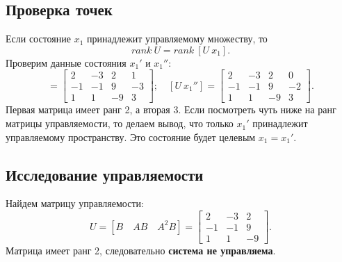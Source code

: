 \subsection{Проверка точек}

Если состояние $x_1$ принадлежит управляемому множеству, то
\begin{equation*}
    rank\ U=rank\ [U\ x_1].
\end{equation*}
Проверим данные состояния $x_1'$ и $x_1''$:
\begin{equation*}
    [U\ x_1']=
    \begin{bmatrix}
        2 & -3 & 2 & 1\\
        -1 & -1 & 9 & -3\\
        1 & 1 & -9 & 3
    \end{bmatrix};\quad
    [U\ x_1'']=
    \begin{bmatrix}
        2 & -3 & 2 & 0\\
        -1 & -1 & 9 & -2\\
        1 & 1 & -9 & 3
    \end{bmatrix}.
\end{equation*}
Первая матрица имеет ранг 2, а вторая 3. Если посмотреть чуть ниже на ранг матрицы управляемости,
то делаем вывод, что только $x_1'$ принадлежит управляемому пространству. Это состояние будет
целевым $x_1=x_1'$.

\subsection{Исследование управляемости}

Найдем матрицу управляемости:
\begin{equation*}
    U=[B\quad AB\quad A^2B]=
    \begin{bmatrix}
        2 & -3 & 2 \\ -1 & -1 & 9 \\ 1 & 1 & -9
    \end{bmatrix}.
\end{equation*}
Матрица имеет ранг 2, следовательно \textbf{система не управляема}.

